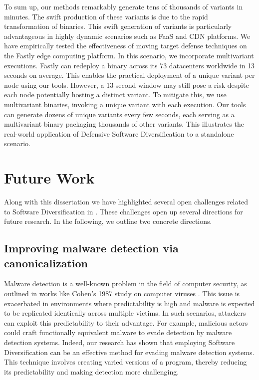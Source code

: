 To sum up, our methods remarkably generate tens of thousands of variants in minutes. 
The swift production of these variants is due to the rapid transformation of \Wasm binaries. 
This swift generation of variants is particularly advantageous in highly dynamic scenarios such as FaaS and CDN platforms. 
We have empirically tested the effectiveness of moving target defense techniques\cite{jackson2011compiler} on the Fastly edge computing platform. 
In this scenario, we incorporate multivariant executions\cite{MEWE}. 
Fastly can redeploy a \Wasm binary across its 73 datacenters worldwide in 13 seconds on average. 
This enables the practical deployment of a unique variant per node using our tools. 
However, a 13-second window may still pose a risk despite each node potentially hosting a distinct \Wasm variant. 
To mitigate this, we use multivariant binaries, invoking a unique variant with each execution. 
Our tools can generate dozens of unique variants every few seconds, each serving as a multivariant binary packaging thousands of other variants. 
This illustrates the real-world application of Defensive Software Diversification to a \Wasm standalone scenario.







\section{Future Work}

Along with this dissertation we have highlighted several open challenges related to Software Diversification in \Wasm.
These challenges open up several directions for future research.
In the following, we outline two concrete directions.



\subsection{Improving \Wasm malware detection via canonicalization}

    Malware detection is a well-known problem in the field of computer security, as outlined in works like Cohen's 1987 study on computer viruses \cite{cohen1987computer}. 
    This issue is exacerbated in environments where predictability is high and malware is expected to be replicated identically across multiple victims. 
    In such scenarios, attackers can exploit this predictability to their advantage. 
    For example, malicious actors could craft functionally equivalent malware to evade detection by malware detection systems.
    Indeed, our research has shown that employing Software Diversification can be an effective method for evading malware detection systems. 
    This technique involves creating varied versions of a program, thereby reducing its predictability and making detection more challenging. 
   
